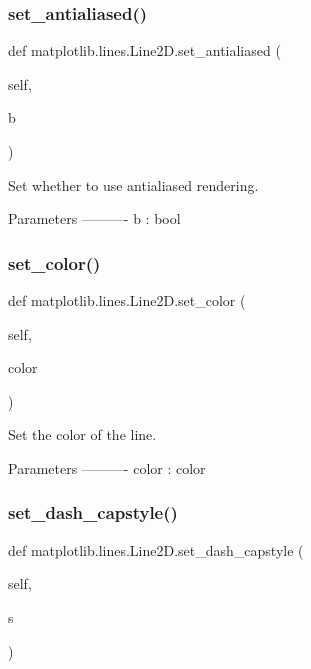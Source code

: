 \subsubsection{\texorpdfstring{set\+\_\+antialiased()}{set\_antialiased()}}
{\footnotesize\ttfamily def matplotlib.\+lines.\+Line2\+D.\+set\+\_\+antialiased (\begin{DoxyParamCaption}\item[{}]{self,  }\item[{}]{b }\end{DoxyParamCaption})}

\begin{DoxyVerb}Set whether to use antialiased rendering.

Parameters
----------
b : bool
\end{DoxyVerb}
 \mbox{\label{classmatplotlib_1_1lines_1_1Line2D_a407ee188db2fc879e53362240425ef4a}} 
\subsubsection{\texorpdfstring{set\+\_\+color()}{set\_color()}}
{\footnotesize\ttfamily def matplotlib.\+lines.\+Line2\+D.\+set\+\_\+color (\begin{DoxyParamCaption}\item[{}]{self,  }\item[{}]{color }\end{DoxyParamCaption})}

\begin{DoxyVerb}Set the color of the line.

Parameters
----------
color : color
\end{DoxyVerb}
 \mbox{\label{classmatplotlib_1_1lines_1_1Line2D_aa49caecc2a94b9dff54398773367aaca}} 
\subsubsection{\texorpdfstring{set\+\_\+dash\+\_\+capstyle()}{set\_dash\_capstyle()}}
{\footnotesize\ttfamily def matplotlib.\+lines.\+Line2\+D.\+set\+\_\+dash\+\_\+capstyle (\begin{DoxyParamCaption}\item[{}]{self,  }\item[{}]{s }\end{DoxyParamCaption})}

